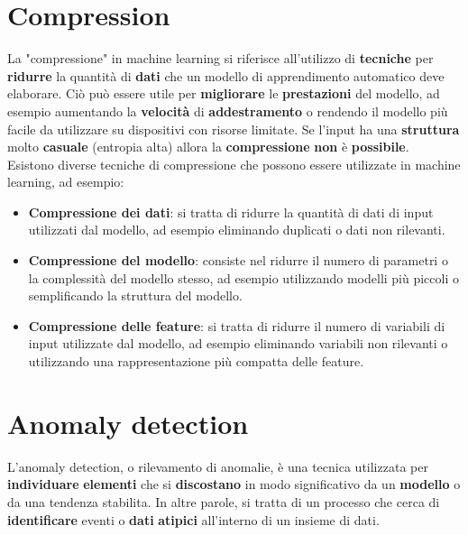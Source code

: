 \documentclass{article}
\begin{document}
\section{Compression}
La "compressione" in machine learning si riferisce all'utilizzo di \textbf{tecniche} per \textbf{ridurre} la quantità di \textbf{dati} che un modello di apprendimento automatico deve elaborare. Ciò può essere utile per \textbf{migliorare} le \textbf{prestazioni} del modello, ad esempio aumentando la \textbf{velocità} di \textbf{addestramento} o rendendo il modello più facile da utilizzare su dispositivi con risorse limitate. Se l'input ha una \textbf{struttura} molto \textbf{casuale} (entropia alta) allora la \textbf{compressione} \textbf{non} è \textbf{possibile}.
\\
Esistono diverse tecniche di compressione che possono essere utilizzate in machine learning, ad esempio:
\\
\begin{itemize}
    \item \textbf{Compressione dei dati}: si tratta di ridurre la quantità di dati di input utilizzati dal modello, ad esempio eliminando duplicati o dati non rilevanti.
    \item \textbf{Compressione del modello}: consiste nel ridurre il numero di parametri o la complessità del modello stesso, ad esempio utilizzando modelli più piccoli o semplificando la struttura del modello.
    \item \textbf{Compressione delle feature}: si tratta di ridurre il numero di variabili di input utilizzate dal modello, ad esempio eliminando variabili non rilevanti o utilizzando una rappresentazione più compatta delle feature.
\end{itemize}

\section{Anomaly detection}
L'anomaly detection, o rilevamento di anomalie, è una tecnica utilizzata per \textbf{individuare} \textbf{elementi} che si \textbf{discostano} in modo significativo da un \textbf{modello} o da una tendenza stabilita. In altre parole, si tratta di un processo che cerca di \textbf{identificare} eventi o \textbf{dati} \textbf{atipici} all'interno di un insieme di dati.
\end{document}
